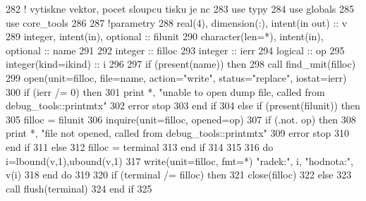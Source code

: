 \begin{DoxyCode}
282     \textcolor{comment}{! vytiskne vektor, pocet sloupcu tisku je nc}
283       \textcolor{keywordtype}{use }typy
284       \textcolor{keywordtype}{use }globals
285       \textcolor{keywordtype}{use }core_tools
286       
287       \textcolor{comment}{!parametry}
288       \textcolor{keywordtype}{real(4)}, \textcolor{keywordtype}{dimension(:)}, \textcolor{keywordtype}{intent(in out)} :: v
289       \textcolor{keywordtype}{integer}, \textcolor{keywordtype}{intent(in)}, \textcolor{keywordtype}{optional} :: filunit   
290       \textcolor{keywordtype}{character(len=*)}, \textcolor{keywordtype}{intent(in)}, \textcolor{keywordtype}{optional} :: name
291 
292       \textcolor{keywordtype}{integer} :: filloc
293       \textcolor{keywordtype}{integer} :: ierr
294       \textcolor{keywordtype}{logical} :: op
295       \textcolor{keywordtype}{integer(kind=ikind)} :: i
296       
297       \textcolor{keywordflow}{if} (\textcolor{keyword}{present}(name)) \textcolor{keywordflow}{then}
298         \textcolor{keyword}{call }find_unit(filloc)
299         \textcolor{keyword}{open}(unit=filloc, file=name, action=\textcolor{stringliteral}{"write"}, status=\textcolor{stringliteral}{"replace"}, iostat=ierr)
300         \textcolor{keywordflow}{if} (ierr /= 0) \textcolor{keywordflow}{then}
301           print *, \textcolor{stringliteral}{"unable to open dump file, called from debug\_tools::printmtx"}
302           error stop
303 \textcolor{keywordflow}{        end if}
304       \textcolor{keywordflow}{else} \textcolor{keywordflow}{if} (\textcolor{keyword}{present}(filunit)) \textcolor{keywordflow}{then}
305         filloc = filunit
306         \textcolor{keyword}{inquire}(unit=filloc, opened=op)
307         \textcolor{keywordflow}{if} (.not. op) \textcolor{keywordflow}{then}
308           print *, \textcolor{stringliteral}{"file not opened, called from debug\_tools::printmtx"}
309           error stop
310 \textcolor{keywordflow}{        end if}
311       \textcolor{keywordflow}{else}
312         filloc = terminal
313 \textcolor{keywordflow}{      end if}
314      
315 
316       \textcolor{keywordflow}{do} i=lbound(v,1),ubound(v,1)
317          \textcolor{keyword}{write}(unit=filloc, fmt=*) \textcolor{stringliteral}{"radek:"}, i, \textcolor{stringliteral}{"hodnota:"}, v(i)
318 \textcolor{keywordflow}{      end do}
319 
320       \textcolor{keywordflow}{if} (terminal /= filloc) \textcolor{keywordflow}{then}
321         \textcolor{keyword}{close}(filloc)
322       \textcolor{keywordflow}{else}
323         \textcolor{keyword}{call }flush(terminal)
324 \textcolor{keywordflow}{      end if}
325   
\end{DoxyCode}


